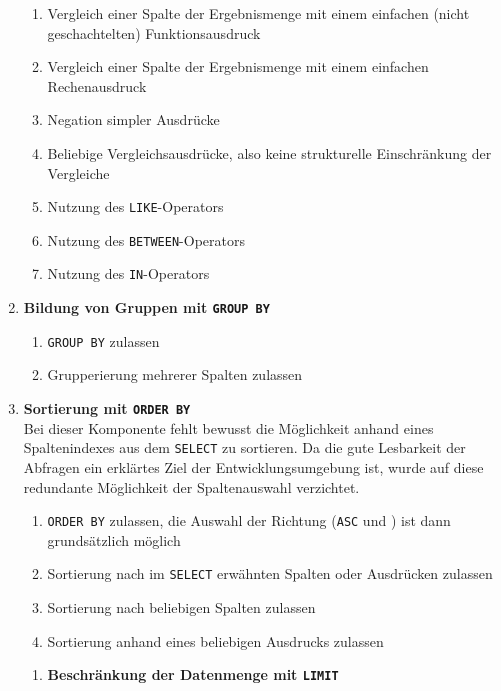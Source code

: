 \begin{enumerate}
\begin{enumerate}
  \item \label{feat:where-compare-simple-func} Vergleich einer Spalte der Ergebnismenge mit einem einfachen (nicht geschachtelten) Funktionsausdruck
  \item \label{feat:where-compare-simple-expression} Vergleich einer Spalte der Ergebnismenge mit einem einfachen Rechenausdruck
  \item \label{feat:where-compare-negate} Negation simpler Ausdrücke
  \item \label{feat:where-any-expression} Beliebige Vergleichsausdrücke, also keine strukturelle Einschränkung der Vergleiche
  \item \label{feat:where-like} Nutzung des \texttt{LIKE}-Operators
  \item \label{feat:where-between} Nutzung des \texttt{BETWEEN}-Operators
  \item \label{feat:where-in} Nutzung des \texttt{IN}-Operators

  \end{enumerate}
\item \textbf{Bildung von Gruppen mit \texttt{GROUP BY}}
  \begin{enumerate}
  \item \label{feat:group-allow} \texttt{GROUP BY} zulassen
  \item \label{feat:group-multiple} Grupperierung mehrerer Spalten zulassen
  \end{enumerate}
\item \textbf{Sortierung mit \texttt{ORDER BY}} \\
  Bei dieser Komponente fehlt bewusst die Möglichkeit anhand eines Spaltenindexes aus dem \texttt{SELECT} zu sortieren. Da die gute Lesbarkeit der Abfragen ein erklärtes Ziel der Entwicklungsumgebung ist, wurde auf diese redundante Möglichkeit der Spaltenauswahl verzichtet.
  \begin{enumerate}
  \item \label{feat:order-allow} \texttt{ORDER BY} zulassen, die Auswahl der Richtung (\texttt{ASC} und ) ist dann grundsätzlich möglich
  \item \label{feat:order-select} Sortierung nach im \texttt{SELECT} erwähnten Spalten oder Ausdrücken zulassen
  \item \label{feat:order-any-column} Sortierung nach beliebigen Spalten zulassen
  \item \label{feat:order-expression} Sortierung anhand eines beliebigen Ausdrucks zulassen
  \end{enumerate}
  
  \begin{enumerate}
  \item \textbf{Beschränkung der Datenmenge mit \texttt{LIMIT}} \\  
  \end{enumerate}
\end{enumerate}


